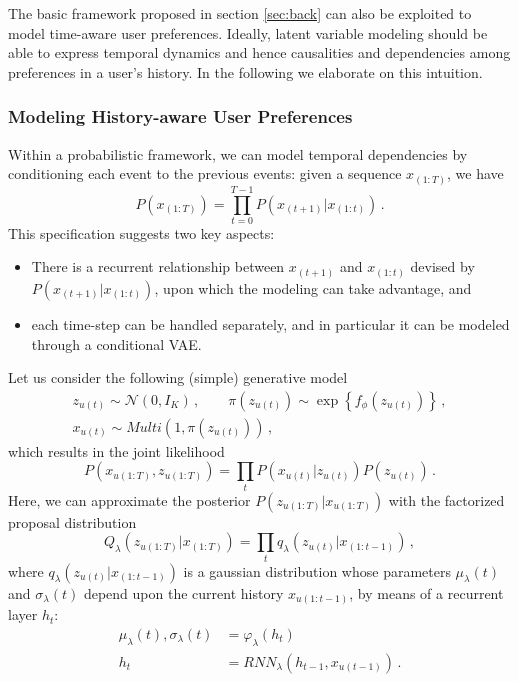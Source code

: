 \documentclass[sigconf]{acmart}
\newcommand{\bs}[1]{\ensuremath{\bm{\mathit{#1}}}}
\numberwithin{equation}{section}
\begin{document}
The basic framework proposed in section \ref{sec:back} can also
be exploited to model time-aware user preferences. Ideally, latent
variable modeling should be able to express temporal dynamics and hence
causalities and dependencies among preferences in a user's
history. In the following we elaborate on this intuition. 






\subsubsection{Modeling History-aware User Preferences}\label{sec:svae-simple}
Within a probabilistic framework, we can model temporal dependencies by
conditioning each event to the previous events: given a sequence
$\bs{x}_{(1:T)}$, we have
$$
P\left(\bs{x}_{(1:T)}\right) = \prod_{t=0}^{T-1}
P\left(\bs{x}_{(t+1)}| \bs{x}_{(1:t)}\right) \, .
$$
This specification suggests two key aspects: 
\begin{itemize}
\item There is a recurrent relationship between $\bs{x}_{(t+1)}$
  and $\bs{x}_{(1:t)}$ devised by
  $P\left(\bs{x}_{(t+1)}|\bs{x}_{(1:t)}\right)$, upon which the
  modeling can take advantage,   and 
\item each time-step can be handled separately, and in particular it
  can be modeled through a conditional VAE. 
\end{itemize}

Let us consider the following (simple) generative model 
\begin{equation}\label{eq:svae}
\begin{gathered}
\bs{z}_{u(t)} \sim \mathcal{N}\left(\bs{0},\bs{I}_K\right) \, , 
\qquad  \pi\left(\bs{z}_{u(t)}\right)
\sim \exp\left\{f_\phi\left(\bs{z}_{u(t)}\right)\right\} \, , \\[2mm]
 \bs{x}_{u(t)} \sim \mathit{Multi}\left(1,\pi\left(\bs{z}_{u(t)}\right)\right) \, ,
\end{gathered}
\end{equation}
which results in the joint likelihood
$$
P(\bs{x}_{u(1:T)}, \bs{z}_{u(1:T)}) = \prod_t
P(\bs{x}_{u(t)} |\bs{z}_{u(t)})P(\bs{z}_{u(t)}) \, .
$$
Here, we can approximate the posterior $P(\bs{z}_{u(1:T)}|
\bs{x}_{u(1:T)})$ with the factorized proposal distribution 
$$
Q_\lambda(\bs{z}_{u(1:T)}|\bs{x}_{(1:T)}) = \prod_t q_\lambda(\bs{z}_{u(t)}|\bs{x}_{(1:t-1)}) \, ,
$$
where $q_\lambda(\bs{z}_{u(t)}|\bs{x}_{(1:t-1)})$ is a gaussian
distribution whose parameters $\bs{\mu}_\lambda(t)$ and
$\bs{\sigma}_\lambda(t)$ depend upon the 
current history $\bs{x}_{u(1:t-1)}$, by means of a recurrent layer $\bs{h}_t$: 
\begin{equation}\label{eq:recurrent}
\begin{split}
\bs{\mu}_\lambda(t), \bs{\sigma}_\lambda(t) & =
                                                               \varphi_\lambda(\bs{h}_t)\\
\bs{h}_t & = \mathit{RNN}_\lambda\left(\bs{h}_{t-1},   \bs{x}_{u(t-1)} \right) \, .
\end{split}
\end{equation}
\end{document}
